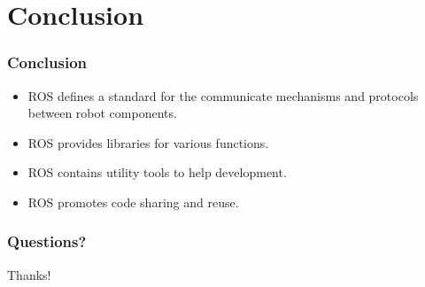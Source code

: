 \documentclass{beamer}
\begin{document}
\section{Conclusion}
\begin{frame}
\frametitle{Conclusion}

\begin{itemize}
  \item ROS defines a standard for the communicate mechanisms and protocols between robot components.
  \item ROS provides libraries for various functions.
  \item ROS contains utility tools to help development.
  \item ROS promotes code sharing and reuse.
\end{itemize}

\end{frame}

\begin{frame}
\frametitle{Questions?}
Thanks!
\end{frame}
\end{document}
